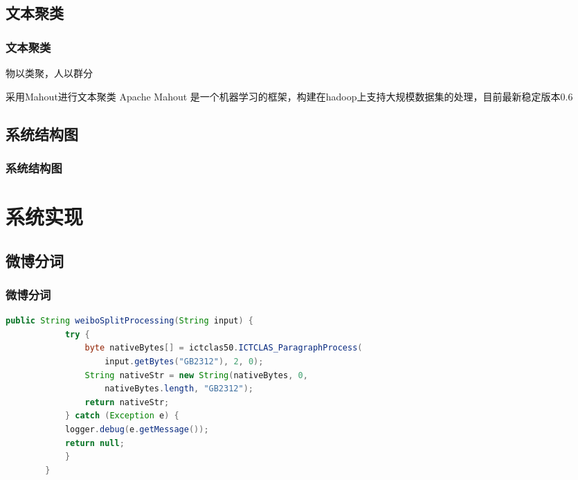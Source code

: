 \documentclass[CJKutf8, table, handout]{beamer}
\begin{document}
\begin{CJK}{UTF8}{gbsn}
\subsection{文本聚类}
\begin{frame}
  \frametitle{文本聚类}
  \begin{block}{}
    \begin{center}物以类聚，人以群分\end{center}
  \end{block}
  \pause
  \begin{block}{采用Mahout进行文本聚类}
    Apache Mahout 是一个机器学习的框架，构建在hadoop上支持大规模数据集的处理，目前最新稳定版本0.6
  \end{block}
\end{frame}

\subsection{系统结构图}
\begin{frame}
  \frametitle{系统结构图}
\end{frame}

\section{系统实现}

\subsection{微博分词}
\begin{frame}[fragile]
  \frametitle{微博分词}
  \lstset{language=Java,basicstyle=\ttfamily,commentstyle=\ttfamily}
  \begin{tiny}
    \begin{block}{}
      \begin{lstlisting}[language=Java]
        public String weiboSplitProcessing(String input) {
            try {
                byte nativeBytes[] = ictclas50.ICTCLAS_ParagraphProcess(
                    input.getBytes("GB2312"), 2, 0);
                String nativeStr = new String(nativeBytes, 0,
                    nativeBytes.length, "GB2312");
                return nativeStr;
            } catch (Exception e) {
            logger.debug(e.getMessage());
            return null;
            }
        }
    \end{lstlisting}
    \end{block}
  \end{tiny}
\end{frame}


\end{CJK}
\end{document}
